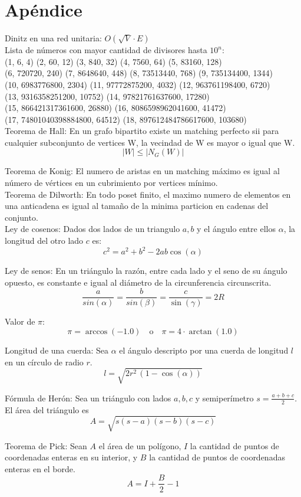 \documentclass[12pt,a4paper]{article}
\begin{document}
\section*{Apéndice} \vspace{1em}

Dinitz en una red unitaria: $O(\sqrt{V}\cdot E)$ \\


Lista de números con mayor cantidad de divisores hasta $10^n$:\\[0.5em]
(1, 6, 4) (2, 60, 12) (3, 840, 32) (4, 7560, 64) (5, 83160, 128)\\
(6, 720720, 240) (7, 8648640, 448) (8, 73513440, 768) (9, 735134400, 1344)\\
(10, 6983776800, 2304) (11, 97772875200, 4032) (12, 963761198400, 6720)\\
(13, 9316358251200, 10752) (14, 97821761637600, 17280)\\
(15, 866421317361600, 26880) (16, 8086598962041600, 41472) \\
(17, 74801040398884800, 64512) (18, 897612484786617600, 103680)\\

Teorema de Hall: En un grafo bipartito existe un matching perfecto sii para cualquier subconjunto de vertices W, la vecindad de W es mayor o igual que W. $$ |W| \leq |N_G(W)| $$

Teorema de Konig: El numero de aristas en un matching máximo es igual al número de vértices en un cubrimiento por vertices mínimo.\\

Teorema de Dilworth: En todo poset finito, el maximo numero de elementos en una anticadena es igual al tamaño de la minima particion en cadenas del conjunto. \\

Ley de cosenos: Dados dos lados de un triangulo $a, b$ y el ángulo entre ellos $\alpha$, la longitud del otro lado $c$ es: $$ c^2 = a^2 + b^2 - 2ab \cos(\alpha) $$

Ley de senos: En un triángulo la razón, entre cada lado y el seno de su ángulo opuesto, es constante e igual al diámetro de la circunferencia circunscrita.  $$ \frac{a}{sin(\alpha)} = \frac{b}{sin(\beta)} = \frac{c}{\sin(\gamma)} = 2R $$

Valor de $\pi$: $$ \pi = \arccos(-1.0) \quad \text{o} \quad \pi = 4 \cdot \arctan(1.0) $$

Longitud de una cuerda: Sea $\alpha$ el ángulo descripto por una cuerda de longitud $l$ en un círculo de radio $r$.  $$ l = \sqrt{2r^2 \, (1 - \cos(\alpha))} $$ 

Fórmula de Herón: Sea un triángulo con lados $a, b, c$ y semiperímetro $s=\tfrac{a+b+c}{2}$. El área del triángulo es $$A = \sqrt{s(s-a)(s-b)(s-c)}$$

Teorema de Pick: Sean $A$ el área de un polígono, $I$ la cantidad de puntos de coordenadas enteras en su interior, y $B$ la cantidad de puntos de coordenadas enteras en el borde.  $$ A = I + \frac{B}{2} - 1 $$
\end{document}
